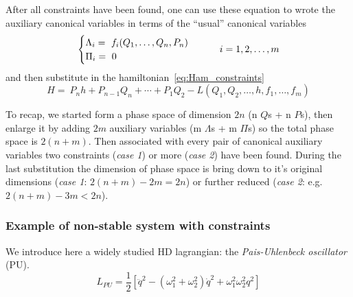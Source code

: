 After all constraints have been found, one can use these equation to wrote the
auxiliary canonical variables in terms of the ``usual'' canonical variables
\begin{equation} \label{eq:constraints_in_terms_of_canonical_vars}
  \begin{cases}
    \Lambda_i =\ f_i(Q_1, \ldots, Q_n, P_n) \\
    \Pi_i =\ 0
  \end{cases}
  \qquad i = 1, 2, \ldots, m \\
\end{equation}
and then substitute in the hamiltonian~\eqref{eq:Ham_constraints}
\begin{equation*}
  H =\ P_n h + P_{n-1} Q_n + \cdots + P_1 Q_2
     - L ( Q_1, Q_2, \ldots, h, f_1, \ldots, f_m)
\end{equation*}

To recap, we started form a phase space of dimension $2n$ (n $Q$s + n $P$s),
then enlarge it by adding $2m$ auxiliary variables (m $\Lambda$s + m $\Pi$s) so
the total phase space is $2(n+m)$. Then associated with every pair of canonical
auxiliary variables two constraints (\emph{case 1}) or more (\emph{case 2}) have
been found.  During the last substitution the dimension of phase space is bring
down to it's original dimensions (\emph{case 1}: $2(n+m) - 2m = 2n$) or further
reduced (\emph{case 2}: e.g. $2(n+m) - 3m < 2n$).

\subsubsection{Example of non-stable system with constraints}
We introduce here a widely studied HD lagrangian: the
\emph{Pais-Uhlenbeck oscillator} (PU).
\begin{equation} \label{eq:lagrangian_PU}
  L_{PU} = \frac{1}{2} \left[
    \ddot{q}^2 - (\omega_1^2 + \omega_2^2) \dot{q}^2 + \omega_1^2 \omega_2^2 q^2
  \right]
\end{equation}

